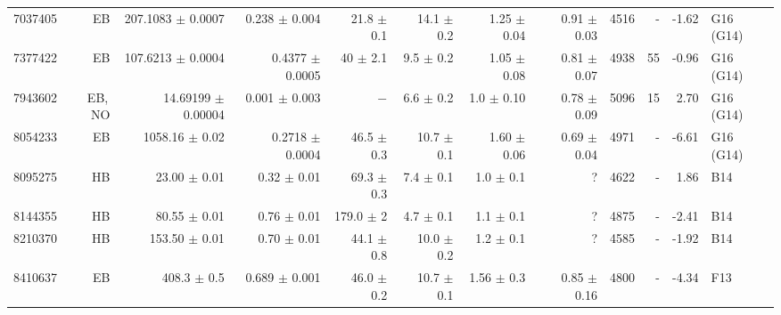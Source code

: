 \begin{landscape}
\begin{longtable}{rrrrrrrrrrrl}
	7037405	&	EB	&	207.1083	$\pm$	0.0007	&	0.238	$\pm$	0.004	&	21.8	$\pm$	0.1	&		14.1	$\pm$	0.2	&		1.25	$\pm$	0.04	&	0.91	$\pm$	0.03	&	4516	&	-	&	-1.62	&	G16 (G14)	\\	%
	7377422	&	EB	&	107.6213	$\pm$	0.0004	&	0.4377	$\pm$	0.0005	&	40	$\pm$	2.1	&		9.5	$\pm$	0.2	&		1.05	$\pm$	0.08	&	0.81	$\pm$	0.07	&	4938	&	55	&	-0.96	&	G16 (G14)	\\	%
	7943602	&	EB,\,NO	&	14.69199	$\pm$	0.00004	&	0.001	$\pm$	0.003	&	$-$			&		6.6	$\pm$	0.2	&		1.0	$\pm$	0.10	&	0.78	$\pm$	0.09	&	5096	&	15	&	2.70	&	G16 (G14)	\\	%
	8054233	&	EB	&	1058.16	$\pm$	0.02	&	0.2718	$\pm$	0.0004	&	46.5	$\pm$	0.3	&		10.7	$\pm$	0.1	&		1.60	$\pm$	0.06	&	0.69	$\pm$	0.04	&	4971	&	-	&	-6.61	&	G16 (G14)	\\	%
	8095275	&	HB	&	23.00	$\pm$	0.01	&	0.32	$\pm$	0.01	&	69.3	$\pm$	0.3	&		7.4	$\pm$	0.1	&		1.0	$\pm$	0.1	&	?			&	4622	&	-	&	1.86	&	B14	\\	%
	8144355	&	HB	&	80.55	$\pm$	0.01	&	0.76	$\pm$	0.01	&	179.0	$\pm$	2	&		4.7	$\pm$	0.1	&		1.1	$\pm$	0.1	&	?			&	4875	&	-	&	-2.41	&	B14	\\	%
	8210370	&	HB	&	153.50	$\pm$	0.01	&	0.70	$\pm$	0.01	&	44.1	$\pm$	0.8	&		10.0	$\pm$	0.2	&		1.2	$\pm$	0.1	&	?			&	4585	&	-	&	-1.92	&	B14	\\	%
	8410637	&	EB	&	408.3	$\pm$	0.5	&	0.689	$\pm$	0.001	&	46.0	$\pm$	0.2	&		10.7	$\pm$	0.1	&		1.56	$\pm$	0.3	&	0.85	$\pm$	0.16	&	4800	&	-	&	-4.34	&	F13	\\	%
	

\end{longtable}
\end{landscape}
